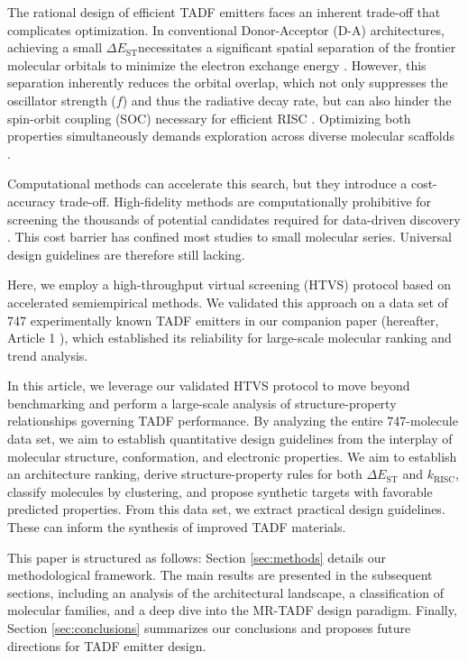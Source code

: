 \documentclass[journal=jcisd8,manuscript=article,keywords=true]{achemso}
\newcommand{\deltaest}{$\Delta E_{\text{ST}}$}
\begin{document}
The rational design of efficient TADF emitters faces an inherent trade-off that complicates optimization. In conventional Donor-Acceptor (D-A) architectures, achieving a small \deltaest necessitates a significant spatial separation of the frontier molecular orbitals to minimize the electron exchange energy \cite{Moral2015}. However, this separation inherently reduces the orbital overlap, which not only suppresses the oscillator strength ($f$) and thus the radiative decay rate, but can also hinder the spin-orbit coupling (SOC) necessary for efficient RISC \cite{Penfold2015, Olivier2017}. Optimizing both properties simultaneously demands exploration across diverse molecular scaffolds \cite{Gibson2016}.

Computational methods can accelerate this search, but they introduce a cost-accuracy trade-off. High-fidelity methods are computationally prohibitive for
screening the thousands of potential candidates required for data-driven discovery
\cite{Sun2015, Kang2024, Olivier2017a}. This cost barrier has confined most studies to small molecular series. Universal design guidelines are therefore still lacking.

Here, we employ a high-throughput virtual screening (HTVS) protocol based on accelerated semiempirical methods. We validated this approach on a data set of \num{747} experimentally known TADF emitters in our companion paper (hereafter, Article 1 \cite{TchapetArxivA1-2025}), which established its reliability for large-scale molecular ranking and trend analysis.

In this article, we leverage our validated HTVS protocol to move beyond benchmarking and perform a large-scale analysis of structure-property relationships governing TADF performance. By analyzing the entire 747-molecule data set, we aim to establish quantitative design guidelines from the interplay of molecular structure, conformation, and electronic properties. We aim to establish an architecture ranking, derive structure-property rules for both \deltaest{} and $k_{\text{RISC}}$, classify molecules by clustering, and propose synthetic targets with favorable predicted properties. From this data set, we extract practical design guidelines. These can inform the synthesis of improved TADF materials.

This paper is structured as follows: Section \ref{sec:methods} details our
methodological framework. The main results are presented in the subsequent sections,
including an analysis of the architectural landscape, a classification of molecular
families, and a deep dive into the MR-TADF design paradigm. Finally,
Section \ref{sec:conclusions} summarizes our conclusions and proposes future directions
for TADF emitter design.
\end{document}

